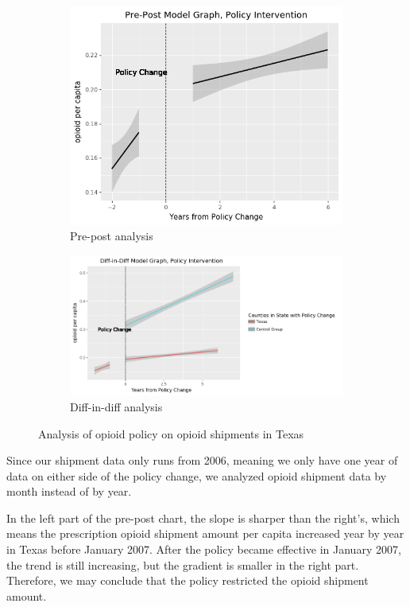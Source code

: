\documentclass[12pt,letterpaper]{article}
\begin{document}
\begin{figure}[!h]
\centering
\begin{subfigure}{.5\textwidth}
  \centering
  \includegraphics[width=0.7\linewidth]{../30_results/General_Results/texas_opioid_shipment_prepost.png}
  \caption{Pre-post analysis}
  \label{fig:tx_ship_prepost}
\end{subfigure}%
\begin{subfigure}{.55\textwidth}
  \centering
  \includegraphics[width=1\linewidth]{../30_results/General_Results/texas_opioid_shipment_diffdiff.png}
  \caption{Diff-in-diff analysis}
  \label{fig:tx_ship_did}
\end{subfigure}
\caption{Analysis of opioid policy on opioid shipments in Texas}
\label{fig:tx_ship}
\end{figure}
Since our shipment data only runs from 2006, meaning we only have one year of data on either side of the policy change, we analyzed opioid shipment data by month instead of by year.

In the left part of the pre-post chart, the slope is sharper than the right's, which means the prescription opioid shipment amount per capita increased year by year in Texas before January 2007. After the policy became effective in January 2007, the trend is still increasing, but the gradient is smaller in the right part. Therefore, we may conclude that the policy restricted the opioid shipment amount.
\end{document}
